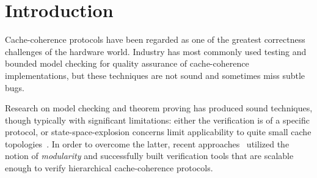 \documentclass[sigplan,10pt,review,anonymous,screen]{acmart}\settopmatter{printfolios=true,printccs=false,printacmref=false}
\begin{document}
\newcommand{\msgsf}[1]{\ensuremath{\textsf{#1}}}
\newcommand{\msgsfsm}[1]{{\small\ensuremath{\textsf{#1}}}}
\newcommand{\rdmsg}[1]{{\color{myred}\msgsf{#1}}}
\newcommand{\rdmsgsm}[1]{{\color{myred}\msgsfsm{#1}}}
\newcommand{\blmsg}[1]{{\color{myblue}\msgsf{#1}}}
\newcommand{\blmsgsm}[1]{{\color{myblue}\msgsfsm{#1}}}
\newcommand{\idmsf}[2]{\idmbuild{#1}{\textsf{#2}}}
\newcommand{\spredmsg}[3]{\ensuremath{#1 \vdash #2\{#3\}}}
\newcommand{\predmsg}[2]{\ensuremath{#1\{#2\}}}

\newcommand{\rulelbl}[2]{\ensuremath{#1:(#2)}}
\newcommand{\rdrulelbl}[2]{{\small\color{myred}\rulelbl{#1}{#2}}}
\newcommand{\blrulelbl}[2]{{\small\color{myblue}\rulelbl{#1}{#2}}}


\maketitle

\section{Introduction}
\label{sec-intro}


Cache-coherence protocols have been regarded as one of the greatest correctness challenges of the hardware world.
Industry has most commonly used testing and bounded model checking for quality assurance of cache-coherence implementations, but these techniques are not sound and sometimes miss subtle bugs.%

Research on model checking and theorem proving has produced sound techniques, though typically with significant limitations:
either the verification is of a specific protocol, or state-space-explosion concerns limit applicability to quite small cache topologies~\cite{Komuravelli:2014,Murali:2015,Banks:2017,Oswald:2018}.
In order to overcome the latter, recent approaches~\cite{Chen:2008,Chen:2010,McMillan:2016,Opeoluwa:2016,Opeoluwa:2017,Oswald:2020} utilized the notion of \emph{modularity} and successfully built verification tools that are scalable enough to verify hierarchical cache-coherence protocols.
\end{document}
